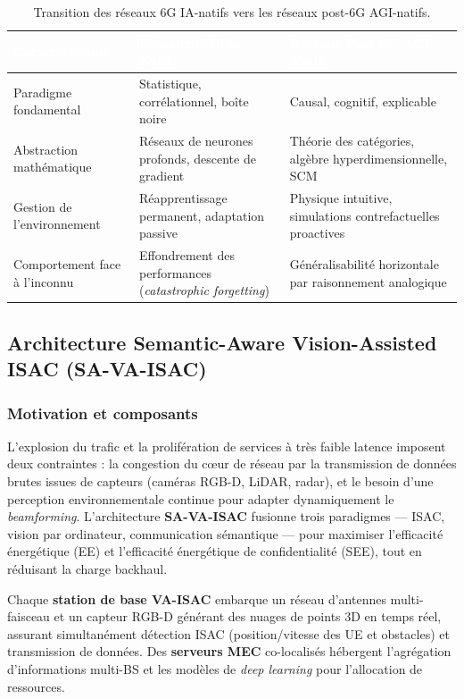 \documentclass[12pt,a4paper,titlepage]{article}
\newcommand{\hd}[1]{\textcolor{white}{\textbf{#1}}}
\begin{document}
\begin{table}[H]
    \centering
    \caption{Transition des réseaux 6G IA-natifs vers les réseaux post-6G AGI-natifs.}
    \label{tab:agi_transition}
    \begin{tabularx}{\textwidth}{F{3.4cm}LL}
        \toprule
        \hd{Caractéristique} & \hd{Réseaux 6G IA-Natifs} & \hd{Réseaux Post-6G AGI-Natifs} \\
        \midrule
        Paradigme fondamental & Statistique, corrélationnel, boîte noire & Causal, cognitif, explicable \\
        Abstraction mathématique & Réseaux de neurones profonds, descente de gradient & Théorie des catégories, algèbre hyperdimensionnelle, SCM \\
        Gestion de l'environnement & Réapprentissage permanent, adaptation passive & Physique intuitive, simulations contrefactuelles proactives \\
        Comportement face à l'inconnu & Effondrement des performances (\textit{catastrophic forgetting}) & Généralisabilité horizontale par raisonnement analogique \\
        \bottomrule
    \end{tabularx}
\end{table}

\subsection{Architecture Semantic-Aware Vision-Assisted ISAC (SA-VA-ISAC)}
\label{subsec:sa_va_isac}

\subsubsection{Motivation et composants}

L'explosion du trafic et la prolifération de services à très faible latence imposent deux contraintes : la congestion du c\oe ur de réseau par la transmission de données brutes issues de capteurs (caméras RGB-D, LiDAR, radar), et le besoin d'une perception environnementale continue pour adapter dynamiquement le \textit{beamforming}. L'architecture \textbf{SA-VA-ISAC} fusionne trois paradigmes --- ISAC, vision par ordinateur, communication sémantique --- pour maximiser l'efficacité énergétique (EE) et l'efficacité énergétique de confidentialité (SEE), tout en réduisant la charge backhaul.

Chaque \textbf{station de base VA-ISAC} embarque un réseau d'antennes multi-faisceau et un capteur RGB-D générant des nuages de points 3D en temps réel, assurant simultanément détection ISAC (position/vitesse des UE et obstacles) et transmission de données. Des \textbf{serveurs MEC} co-localisés hébergent l'agrégation d'informations multi-BS et les modèles de \textit{deep learning} pour l'allocation de ressources.
\end{document}
